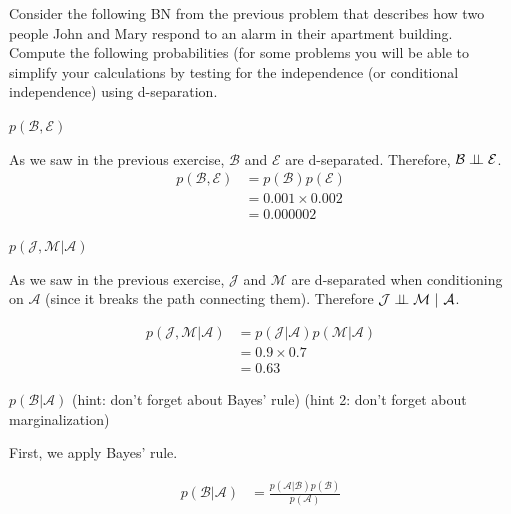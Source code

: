 \documentclass[assignment02_Solutions]{subfiles}
\begin{document}
\begin{exercise}[(60 minutes)]
Consider the following BN from the previous problem that describes how two people John and Mary respond to an alarm in their apartment building.  Compute the following probabilities (for some problems you will be able to simplify your calculations by testing for the independence (or conditional independence) using d-separation.

\bes
\item $p(\mathcal{B}, \mathcal{E})$

\begin{boxedsolution}
As we saw in the previous exercise, $\mathcal{B}$ and $\mathcal{E}$ are d-separated.  Therefore, $\mathcal{B} \perp\!\!\!\perp \mathcal{E}$.
\begin{align}
p(\mathcal{B}, \mathcal{E}) &= p(\mathcal{B}) p(\mathcal{E}) \nonumber \\
&= 0.001 \times 0.002 \nonumber \\
&= 0.000002 \nonumber
\end{align}
\end{boxedsolution}

\item $p(\mathcal{J}, \mathcal{M} | \mathcal{A})$

\begin{boxedsolution}
As we saw in the previous exercise, $\mathcal{J}$ and $\mathcal{M}$ are d-separated when conditioning on $\mathcal{A}$ (since it breaks the path connecting them).  Therefore $\mathcal{J} \perp\!\!\!\perp \mathcal{M}~|~\mathcal{A}$.

\begin{align}
p(\mathcal{J}, \mathcal{M} | \mathcal{A}) &= p(\mathcal{J} | \mathcal{A}) p(\mathcal{M} | \mathcal{A}) \nonumber \\
&= 0.9 \times 0.7 \nonumber \\
&= 0.63 \nonumber
\end{align}
\end{boxedsolution}

\item $p(\mathcal{B} | \mathcal{A})$ (hint: don't forget about Bayes' rule) (hint 2: don't forget about marginalization)

\begin{boxedsolution}
First, we apply Bayes' rule.

\begin{align}
p(\mathcal{B} | \mathcal{A}) &= \frac{p(\mathcal{A} | \mathcal{B}) p(\mathcal{B})}{p(\mathcal{A})} \nonumber 
\end{align}


\end{boxedsolution}
\end{exercise}
\end{document}
